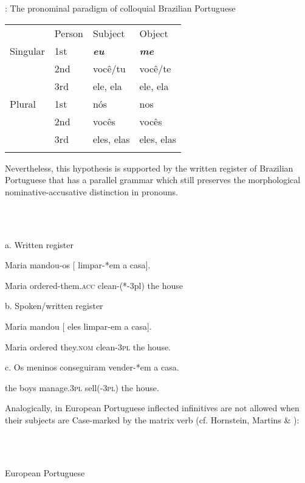 \documentclass[output=paper]{langsci/langscibook}
\begin{document}
       : The pronominal paradigm of colloquial Brazilian Portuguese

\begin{tabularx}{\textwidth}{XXXX}
\lsptoprule

\multicolumn{1}{X}{Number}  & Person & Subject & Object\\
\multicolumn{1}{X}{Singular} & 1st & \textbf{\textit{eu}} & \textbf{\textit{me}}\\
& 2nd & você/tu & você/te\\
\hhline{~---} & 3rd & ele, ela & ele, ela\\
\multicolumn{1}{X}{Plural} & 1st & nós & nos\\
& 2nd & vocês & vocês\\
\hhline{~---} & 3rd & eles, elas & eles, elas\\
\hhline{~---}
\lspbottomrule
\end{tabularx}
Nevertheless, this hypothesis is supported by the written register of Brazilian Portuguese that has a parallel grammar which still preserves the morphological nominative-accusative distinction in pronouns.

\ea%
    \label{ex:key:24}
    \gll\\
        \\
    \glt
    \z

          a.  Written register

Maria mandou-os     [  limpar-*em    a    casa].   

    Maria ordered-them.\textsc{acc}       clean-(*-3pl) the house

  b.  Spoken/written register

Maria mandou [ eles   limpar-em a    casa].  

    Maria ordered    they.\textsc{nom} clean-\textsc{3pl}  the house.

c.  Os meninos conseguiram  vender-*em  a    casa.

     the boys      manage.\textsc{3pl}    sell(-\textsc{3pl})     the house.

Analogically, in European Portuguese inflected infinitives are not allowed when their subjects are Case-marked by the matrix verb (cf. Hornstein, Martins \& \citealt{Nunes2008}):

\ea%
    \label{ex:key:25}
    \gll\\
        \\
    \glt
    \z

          European Portuguese
\end{document}
